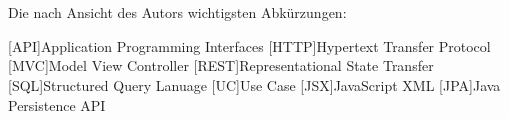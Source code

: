 \chapter*{\nameoflistofacronyms}

Die nach Ansicht des Autors wichtigsten Abkürzungen:
\bigskip

\begin{adjustwidth}{1.5em}{}
\begin{acronym}[AAAAA] %
	
	
	
	[API]{Application Programming Interfaces}
	[HTTP]{Hypertext Transfer Protocol}
	[MVC]{Model View Controller}
	[REST]{Representational State Transfer}
	[SQL]{Structured Query Lanuage}
	[UC]{Use Case}
	[JSX]{JavaScript XML}
	[JPA]{Java Persistence API}

	
	
	
\end{acronym}	
\end{adjustwidth}
